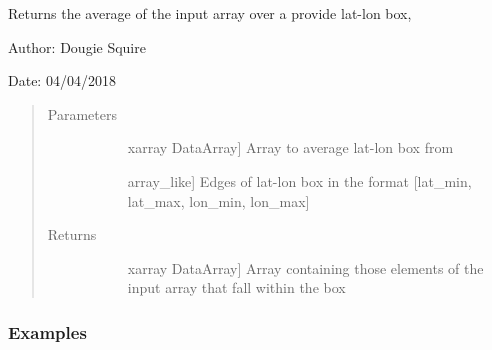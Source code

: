 \documentclass[letterpaper,10pt,english]{sphinxmanual}
\begin{document}
\begin{fulllineitems}
\label{\detokenize{utils_doc:utils.latlon_average}}
Returns the average of the input array over a provide lat-lon box,

\begin{DUlineblock}{0em}
\item[] Author: Dougie Squire
\item[] Date: 04/04/2018
\end{DUlineblock}
\begin{quote}\begin{description}
\item[{Parameters}] \leavevmode\begin{description}
\item[{}] \leavevmode{[}xarray DataArray{]}
Array to average lat-lon box from

\item[{}] \leavevmode{[}array\_like{]}
Edges of lat-lon box in the format {[}lat\_min, lat\_max, lon\_min, lon\_max{]}

\end{description}

\item[{Returns}] \leavevmode\begin{description}
\item[{}] \leavevmode{[}xarray DataArray{]}
Array containing those elements of the input array that fall within the box

\end{description}

\end{description}\end{quote}
\subsubsection*{Examples}


\end{fulllineitems}
\end{document}
